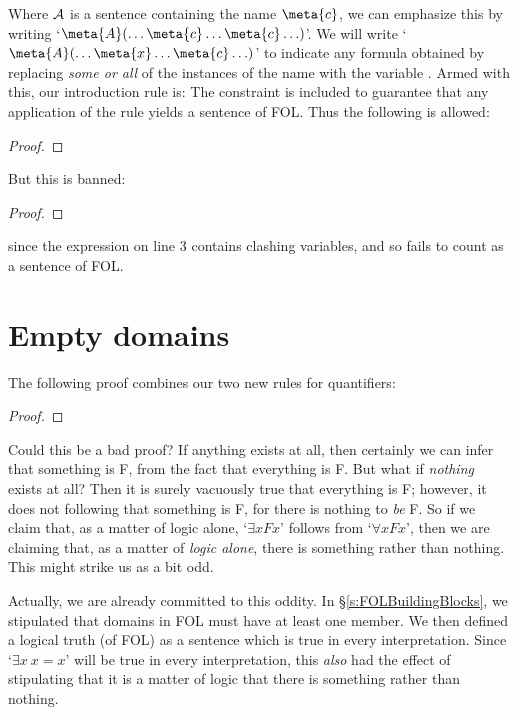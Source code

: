 Where $\mathcal{A}$ is a sentence containing the name $\meta{c}$, we can emphasize this by writing `$\meta{A}(\ldots \meta{c} \ldots \meta{c}\ldots)$'. We will write `$\meta{A}(\ldots \meta{x} \ldots \meta{c}\ldots)$' to indicate any formula obtained by replacing \emph{some or all} of the instances of the name  with the variable . Armed with this, our introduction rule is:
The constraint is included to guarantee that any application of the rule yields a  sentence of FOL. Thus the following is allowed:
\begin{proof}
	 
	 
\end{proof}
But this is banned:
\begin{proof}
	 
\end{proof}
since the expression on line 3 contains clashing variables, and so fails to count as a sentence of FOL.

\section{Empty domains}
The following proof combines our two new rules for quantifiers:
	\begin{proof}
	\end{proof}
Could this be a bad proof? If anything exists at all, then certainly we can infer that something is F, from the fact that everything is F. But what if \emph{nothing} exists at all? Then it is surely vacuously true that everything is F; however, it does not following that something is F, for there is nothing to \emph{be} F. So if we claim that, as a matter of logic alone, `$\exists x Fx$' follows from `$\forall x Fx$', then we are claiming that, as a matter of \emph{logic alone}, there is something rather than nothing. This might strike us as a bit odd.

Actually, we are already committed to this oddity. In \S\ref{s:FOLBuildingBlocks}, we stipulated that domains in FOL must have at least one member. We then defined a logical truth (of FOL) as a sentence which is true in every interpretation. Since `$\exists x\ x=x$' will be true in every interpretation, this \emph{also} had the effect of stipulating that it is a matter of logic that there is something rather than nothing.

